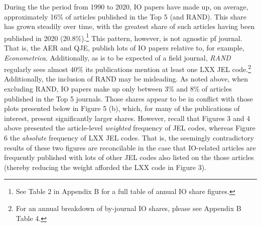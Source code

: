 \documentclass[11pt, letterpaper, twoside]{article}
\begin{document}
During the the period from 1990 to 2020, IO papers have made up, on average, approximately 16\% of articles published in the Top 5 (and RAND). This share has grown steadily over time, with the greatest share of such articles having been published in 2020 (20.8\%).\footnote{See Table 2 in Appendix B for a full table of annual IO share figures.} This pattern, however, is not agnostic pf journal. That is, the AER and QJE, publish lots of IO papers relative to, for example, \textit{Econometrica}. Additionally, as is to be expected of a field journal, \textit{RAND} regularly sees almost 40\% its publications mention at least one LXX JEL code.\footnote{For an annual breakdown of by-journal IO shares, please see Appendix B Table 4.} \\

Additionally, the inclusion of RAND may be misleading. As noted above, when excluding RAND, IO papers make up only between 3\% and 8\% of articles published in the Top 5 journals. Those shares appear to be in conflict with those plots presented below in Figure 5 (b), which, for many of the publications of interest, present significantly larger shares. However, recall that Figures 3 and 4 above presented the article-level \textit{weighted} frequency of JEL codes, whereas Figure 6 the \textit{absolute} frequency of LXX JEL codes. That is, the seemingly contradictory results of these two figures are reconcilable in the case that IO-related articles are frequently published with lots of other JEL codes also listed on the those articles (thereby reducing the weight afforded the LXX code in Figure 3).
\end{document}
